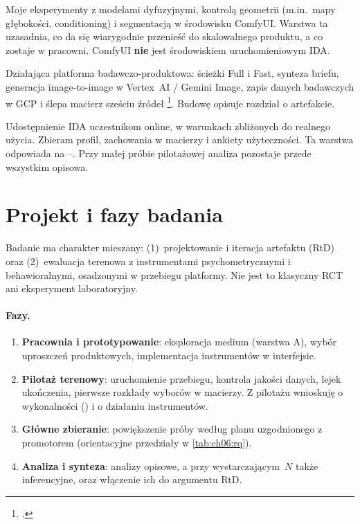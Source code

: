 \begin{description}[style=nextline]
  \item[(A) Praktyka pracowni / ComfyUI]
  Moje eksperymenty z modelami dyfuzyjnymi, kontrolą geometrii (m.in.\ mapy głębokości, conditioning) i segmentacją w środowisku ComfyUI. Warstwa ta uzasadnia, co da się wiarygodnie przenieść do skalowalnego produktu, a co zostaje w pracowni. ComfyUI \textbf{nie} jest środowiskiem uruchomieniowym IDA.

  \item[(B) Artefakt IDA]
  Działająca platforma badawczo-produktowa: ścieżki Full i Fast, synteza briefu, generacja image-to-image w Vertex~AI / Gemini Image, zapis danych badawczych w GCP i ślepa macierz sześciu źródeł \footcite{idaPlatform2026}. Budowę opisuje rozdział o artefakcie.

  \item[(C) Ewaluacja terenowa]
  Udostępnienie IDA uczestnikom online, w warunkach zbliżonych do realnego użycia. Zbieram profil, zachowania w macierzy i ankiety użyteczności. Ta warstwa odpowiada na --. Przy małej próbie pilotażowej analiza pozostaje przede wszystkim opisowa.
\end{description}

\section{Projekt i fazy badania}
\label{ch06:sec:projekt}

Badanie ma charakter mieszany: (1)~projektowanie i iteracja artefaktu (RtD) oraz (2)~ewaluacja terenowa z instrumentami psychometrycznymi i behawioralnymi, osadzonymi w przebiegu platformy. Nie jest to klasyczny RCT ani eksperyment laboratoryjny.

\paragraph{Fazy.}
\begin{enumerate}
  \item \textbf{Pracownia i prototypowanie}: eksploracja medium (warstwa A), wybór uproszczeń produktowych, implementacja instrumentów w interfejsie.
  \item \textbf{Pilotaż terenowy}: uruchomienie przebiegu, kontrola jakości danych, lejek ukończenia, pierwsze rozkłady wyborów w macierzy. Z pilotażu wnioskuję o wykonalności () i o działaniu instrumentów.
  \item \textbf{Główne zbieranie}: powiększenie próby według planu uzgodnionego z promotorem (orientacyjne przedziały w \cref{tab:ch06:rq}).
  \item \textbf{Analiza i synteza}: analizy opisowe, a przy wystarczającym~$N$ także inferencyjne, oraz włączenie ich do argumentu RtD.
\end{enumerate}

